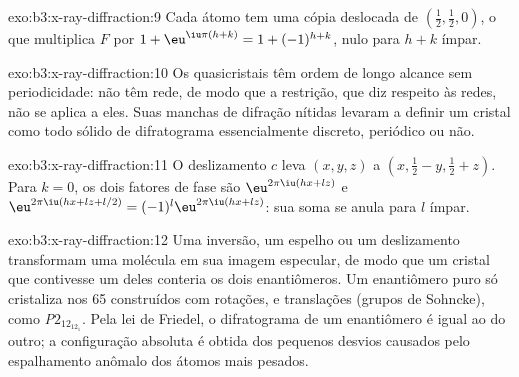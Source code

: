 \begin{solution}{exo:b3:x-ray-diffraction:9}
Cada átomo tem uma cópia deslocada de $(\frac12,\frac12,0)$, o que multiplica $F$ por $1 +
\eu^{\iu\pi(h+k)} = 1 + (-1)^{h+k}$, nulo para $h + k$ ímpar.
\end{solution}

\begin{solution}{exo:b3:x-ray-diffraction:10}
Os quasicristais têm ordem de longo alcance sem periodicidade: não têm rede,
de modo que a restrição, que diz respeito às redes, não se aplica a eles. Suas
manchas de difração nítidas levaram a definir um cristal como todo sólido de
difratograma essencialmente discreto, periódico ou não.
\end{solution}

\begin{solution}{exo:b3:x-ray-diffraction:11}
O deslizamento $c$ leva $(x, y, z)$ a $(x, \frac12 - y, \frac12 + z)$. Para $k = 0$, os dois
fatores de fase são $\eu^{2\pi\iu(hx + lz)}$ e $\eu^{2\pi\iu(hx + lz + l/2)} = (-1)^l
\eu^{2\pi\iu(hx+lz)}$: sua soma se anula para $l$ ímpar.
\end{solution}

\begin{solution}{exo:b3:x-ray-diffraction:12}
Uma inversão, um espelho ou um deslizamento transformam uma molécula em sua
imagem especular, de modo que um cristal que contivesse um deles conteria os dois
enantiômeros. Um enantiômero puro só cristaliza nos 65  construídos
com rotações,  e translações (grupos de Sohncke), como
\textit{P}$2_12_12_1$. Pela lei de Friedel, o difratograma de um enantiômero é igual ao
do outro; a configuração absoluta é obtida dos pequenos desvios causados pelo
espalhamento anômalo dos átomos mais pesados.
\end{solution}

